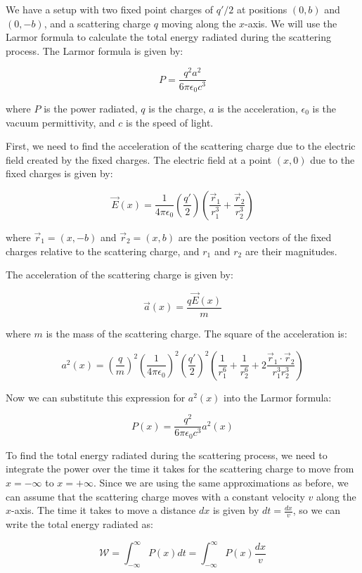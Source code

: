 \documentclass{article}
\begin{document}
    We have a setup with two fixed point charges of $q'/2$ at positions $(0, b)$ and $(0, -b)$, and a scattering charge $q$ moving along the $x$-axis. We will use the Larmor formula to calculate the total energy radiated during the scattering process. The Larmor formula is given by:

$$P = \frac{q^2 a^2}{6 \pi \epsilon_0 c^3}$$

where $P$ is the power radiated, $q$ is the charge, $a$ is the acceleration, $\epsilon_0$ is the vacuum permittivity, and $c$ is the speed of light.

First, we need to find the acceleration of the scattering charge due to the electric field created by the fixed charges. The electric field at a point $(x, 0)$ due to the fixed charges is given by:

$$\vec{E}(x) = \frac{1}{4 \pi \epsilon_0} \left(\frac{q'}{2}\right) \left(\frac{\vec{r}_1}{r_1^3} + \frac{\vec{r}_2}{r_2^3}\right)$$

where $\vec{r}_1 = (x, -b)$ and $\vec{r}_2 = (x, b)$ are the position vectors of the fixed charges relative to the scattering charge, and $r_1$ and $r_2$ are their magnitudes.

The acceleration of the scattering charge is given by:

$$\vec{a}(x) = \frac{q \vec{E}(x)}{m}$$

where $m$ is the mass of the scattering charge. The square of the acceleration is:

$$a^2(x) = \left(\frac{q}{m}\right)^2 \left(\frac{1}{4 \pi \epsilon_0}\right)^2 \left(\frac{q'}{2}\right)^2 \left(\frac{1}{r_1^6} + \frac{1}{r_2^6} + 2 \frac{\vec{r}_1 \cdot \vec{r}_2}{r_1^3 r_2^3}\right)$$

Now we can substitute this expression for $a^2(x)$ into the Larmor formula:

$$P(x) = \frac{q^2}{6 \pi \epsilon_0 c^3} a^2(x)$$

To find the total energy radiated during the scattering process, we need to integrate the power over the time it takes for the scattering charge to move from $x = -\infty$ to $x = +\infty$. Since we are using the same approximations as before, we can assume that the scattering charge moves with a constant velocity $v$ along the $x$-axis. The time it takes to move a distance $dx$ is given by $dt = \frac{dx}{v}$, so we can write the total energy radiated as:

$$\mathcal{W} = \int_{-\infty}^{\infty} P(x) dt = \int_{-\infty}^{\infty} P(x) \frac{dx}{v}$$
\end{document}
